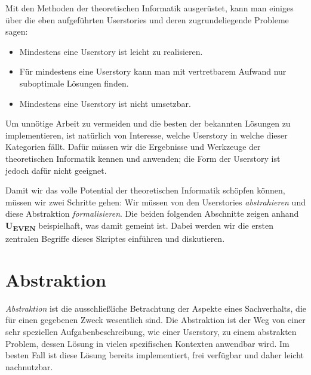 Mit den Methoden der theoretischen Informatik ausgerüstet,
kann man einiges über die eben aufgeführten Userstories und deren zugrundeliegende Probleme sagen:
\begin{itemize}
    \item Mindestens eine Userstory ist leicht zu realisieren.
    \item Für mindestens eine Userstory kann man mit vertretbarem Aufwand nur suboptimale Lösungen finden.
    \item Mindestens eine Userstory ist nicht umsetzbar.
\end{itemize}
Um unnötige Arbeit zu vermeiden
und die besten der bekannten Lösungen zu implementieren,
ist natürlich von Interesse,
welche Userstory in welche dieser Kategorien fällt.
Dafür müssen wir die Ergebnisse und Werkzeuge
der theoretischen Informatik kennen und anwenden;
die Form der Userstory ist jedoch dafür nicht geeignet.

Damit wir das volle Potential der theoretischen Informatik schöpfen können,
müssen wir zwei Schritte gehen:
Wir müssen von den Userstories \emph{abstrahieren}
und diese Abstraktion \emph{formalisieren}.
Die beiden folgenden Abschnitte zeigen anhand \textbf{U\textsubscript{EVEN}}
beispielhaft, was damit gemeint ist.
Dabei werden wir die ersten zentralen Begriffe dieses Skriptes einführen und diskutieren.

\section{Abstraktion}

\emph{Abstraktion} ist die ausschließliche Betrachtung der Aspekte eines Sachverhalts,
die für einen gegebenen Zweck wesentlich sind.
Die Abstraktion ist der Weg von einer sehr speziellen Aufgabenbeschreibung,
wie einer Userstory, zu einem abstrakten Problem,
dessen Lösung in vielen spezifischen Kontexten anwendbar wird.
Im besten Fall ist diese Lösung bereits implementiert, frei verfügbar
und daher leicht nachnutzbar.

